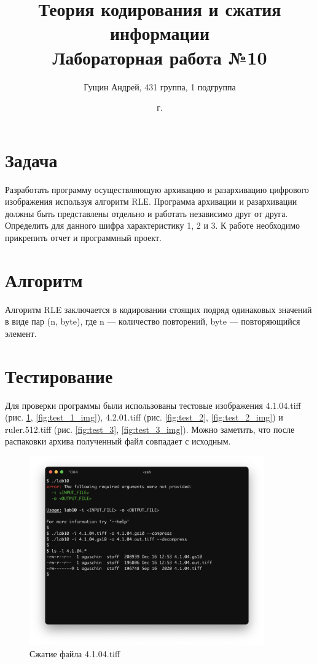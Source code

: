 \documentclass[a4paper,oneside]{article}
\title{{Теория кодирования и сжатия информации}\\{Лабораторная работа №10}}
\author{Гущин Андрей, 431 группа, 1 подгруппа}
\date{\the\year{} г.}
\theoremstyle{definition}
\begin{document}
\maketitle

\section{Задача}

Разработать программу осуществляющую архивацию и разархивацию цифрового
изображения используя алгоритм RLЕ. Программа архивации и разархивации должны
быть представлены отдельно и работать независимо друг от друга. Определить для
данного шифра характеристику 1, 2 и 3. К работе необходимо прикрепить отчет и
программный проект.

\section{Алгоритм}

Алгоритм RLE заключается в кодировании стоящих подряд одинаковых значений
в виде пар (n, byte), где n --- количество повторений, byte --- повторяющийся
элемент.


\section{Тестирование}

Для проверки программы были использованы тестовые изображения 4.1.04.tiff
(рис. \ref{fig:test_1}, \ref{fig:test_1_img}), 4.2.01.tiff (рис.
\ref{fig:test_2}, \ref{fig:test_2_img}) и ruler.512.tiff (рис. \ref{fig:test_3},
\ref{fig:test_3_img}). Можно заметить, что после распаковки архива полученный
файл совпадает с исходным.

\begin{figure}[H]
  \centering
  \includegraphics[width=0.9\textwidth]{test1.jpg}
  \caption{Сжатие файла 4.1.04.tiff}
  \label{fig:test_1}
\end{figure}
\end{document}
